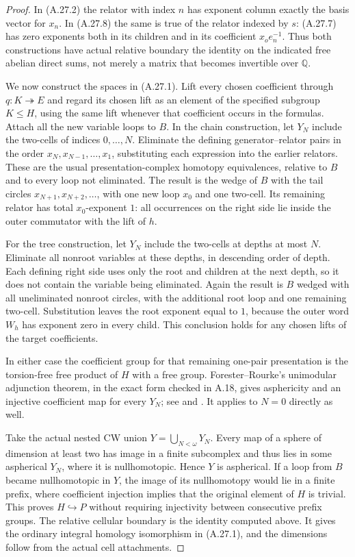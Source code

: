 \begin{proof}
In (A.27.2) the relator with index $n$ has exponent column
exactly the basis vector for $x_n$. In (A.27.8) the same is
true of the relator indexed by $s$: (A.27.7) has zero
exponents both in its children and in its coefficient
$x_oe_n^{-1}$. Thus both constructions have actual relative
boundary the identity on the indicated free abelian direct
sums, not merely a matrix that becomes invertible over
$\mathbb Q$.

We now construct the spaces in (A.27.1). Lift every chosen
coefficient through $q:K\twoheadrightarrow E$ and regard its
chosen lift as an element of the specified subgroup $K\leq H$,
using the same
lift whenever that coefficient occurs in the formulas.
Attach all the new variable loops to $B$. In the chain
construction, let $Y_N$ include the two-cells of indices
$0,\ldots,N$. Eliminate the defining generator--relator pairs
in the order $x_N,x_{N-1},\ldots,x_1$, substituting each
expression into the earlier relators. These are the usual
presentation-complex homotopy equivalences, relative to $B$
and to every loop not eliminated. The result is the wedge of
$B$ with the tail circles $x_{N+1},x_{N+2},\ldots$, with
one new loop $x_0$ and one two-cell. Its remaining relator
has total $x_0$-exponent $1$: all occurrences on the right
side lie inside the outer commutator with the lift of $h$.

For the tree construction, let $Y_N$ include the two-cells
at depths at most $N$. Eliminate all nonroot variables at
these depths, in descending order of depth. Each defining
right side uses only the root and children at the next depth,
so it does not contain the variable being eliminated.
Again the result is $B$ wedged with all uneliminated nonroot
circles, with the additional root loop and one remaining
two-cell. Substitution leaves the root exponent equal to
$1$, because the outer word $W_h$ has exponent zero in
every child. This conclusion holds for any chosen lifts of
the target coefficients.

In either case the coefficient group for that remaining
one-pair presentation is the torsion-free free product of
$H$ with a free group. Forester--Rourke's unimodular
adjunction theorem, in the exact form checked in A.18,
gives asphericity and an injective coefficient map for every
$Y_N$; see
\cite[Theorem~1 and Proposition~1]{CpathsForesterRourke2005Adjunction}
and \cite[\S\S1--3]{CpathsForesterRourkeDiagrams}.
It applies to $N=0$ directly as well.

Take the actual nested CW union $Y=\bigcup_{N<\omega}Y_N$.
Every map of a sphere of dimension at least two has image
in a finite subcomplex and thus lies in some aspherical
$Y_N$, where it is nullhomotopic. Hence $Y$ is aspherical.
If a loop from $B$ became nullhomotopic in $Y$, the image of
its nullhomotopy would lie in a finite prefix, where
coefficient injection implies that the original element
of $H$ is trivial. This proves $H\hookrightarrow P$ without
requiring injectivity between consecutive prefix groups.
The relative cellular boundary is the identity computed
above. It gives the ordinary integral homology isomorphism
in (A.27.1), and the dimensions follow from the actual cell
attachments.


\end{proof}
